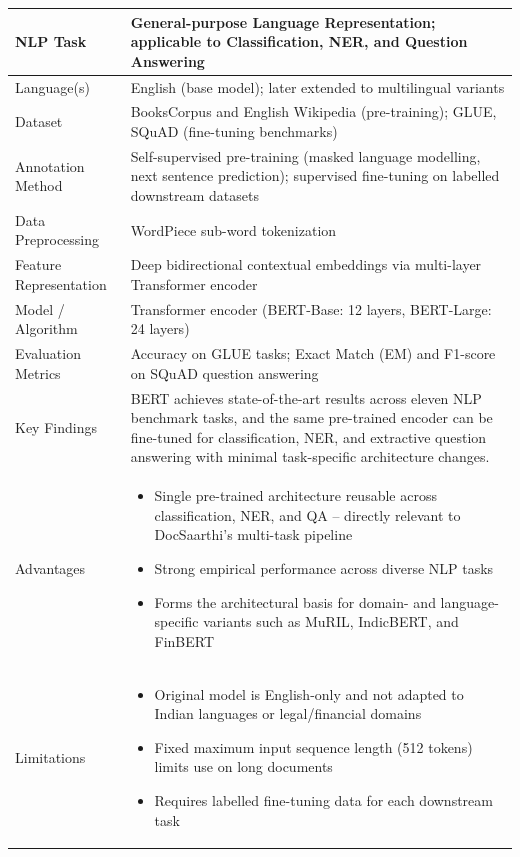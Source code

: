 \begin{longtable}{|p{5cm}|p{10cm}|}
NLP Task &
General-purpose Language Representation; applicable to Classification, NER, and Question Answering
\\ \hline

Language(s) &
English (base model); later extended to multilingual variants
\\ \hline

Dataset &
BooksCorpus and English Wikipedia (pre-training); GLUE, SQuAD (fine-tuning benchmarks)
\\ \hline

Annotation Method &
Self-supervised pre-training (masked language modelling, next sentence prediction); supervised fine-tuning on labelled downstream datasets
\\ \hline

Data Preprocessing &
WordPiece sub-word tokenization
\\ \hline

Feature Representation &
Deep bidirectional contextual embeddings via multi-layer Transformer encoder
\\ \hline

Model / Algorithm &
Transformer encoder (BERT-Base: 12 layers, BERT-Large: 24 layers)
\\ \hline

Evaluation Metrics &
Accuracy on GLUE tasks; Exact Match (EM) and F1-score on SQuAD question answering
\\ \hline

Key Findings &
BERT achieves state-of-the-art results across eleven NLP benchmark tasks, and the same pre-trained encoder can be fine-tuned for classification, NER, and extractive question answering with minimal task-specific architecture changes.
\\ \hline

Advantages &
\begin{itemize}
\item Single pre-trained architecture reusable across classification, NER, and QA -- directly relevant to DocSaarthi's multi-task pipeline
\item Strong empirical performance across diverse NLP tasks
\item Forms the architectural basis for domain- and language-specific variants such as MuRIL, IndicBERT, and FinBERT
\end{itemize}
\\ \hline

Limitations &
\begin{itemize}
\item Original model is English-only and not adapted to Indian languages or legal/financial domains
\item Fixed maximum input sequence length (512 tokens) limits use on long documents
\item Requires labelled fine-tuning data for each downstream task
\end{itemize}
\\ \hline


\end{longtable}
